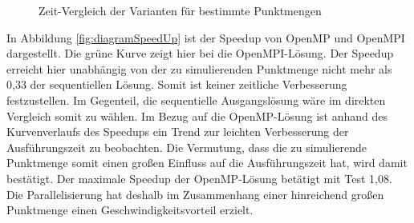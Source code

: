 \begin{figure}[H]
	\centering
	\caption{Zeit-Vergleich der Varianten für bestimmte Punktmengen}
	\label{fig:diagramZeit}
\end{figure}

In Abbildung \ref{fig:diagramSpeedUp} ist der Speedup von OpenMP und OpenMPI dargestellt. Die grüne Kurve zeigt hier bei die OpenMPI-Lösung. Der Speedup erreicht hier unabhängig von der zu simulierenden Punktmenge nicht mehr als 0,33 der sequentiellen Lösung. Somit ist keiner zeitliche Verbesserung festzustellen. Im Gegenteil, die sequentielle Ausgangslösung wäre im direkten Vergleich somit zu wählen.
Im Bezug auf die OpenMP-Lösung ist anhand des Kurvenverlaufs des Speedups ein Trend zur leichten Verbesserung der Ausführungszeit zu beobachten. Die Vermutung, dass die zu simulierende Punktmenge somit einen großen Einfluss auf die Ausführungszeit hat, wird damit bestätigt. Der maximale Speedup der OpenMP-Lösung betätigt mit Test 1,08. Die Parallelisierung hat deshalb im Zusammenhang einer hinreichend großen Punktmenge einen Geschwindigkeitsvorteil erzielt.

